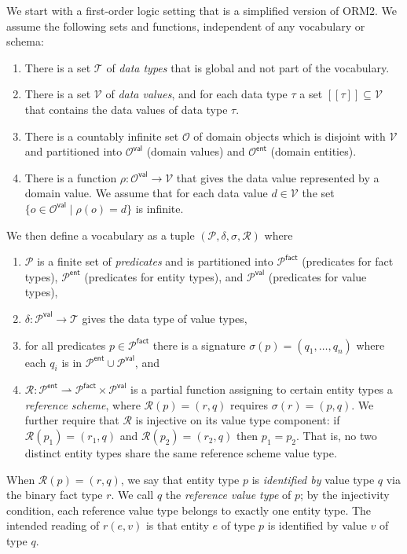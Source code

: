 \documentclass[11pt]{amsart}
\theoremstyle{definition}
\theoremstyle{remark}
\newcommand{\DataTypes}{\mathcal{T}}
\newcommand{\DataValues}{\mathcal{V}}
\newcommand{\DomObjects}{\mathcal{O}}
\newcommand{\DomValues}{\mathcal{O}^{\mathsf{val}}}
\newcommand{\DomEnts}{\mathcal{O}^{\mathsf{ent}}}
\newcommand{\Preds}{\mathcal{P}}
\newcommand{\EntPreds}{\Preds^{\textsf{ent}}}
\newcommand{\ValPreds}{\Preds^{\textsf{val}}}
\newcommand{\FactPreds}{\Preds^{\textsf{fact}}}
\newcommand{\RefSchemes}{\mathcal{R}}
\newcommand{\sem}[1]{[\![{#1}]\!]}
\begin{document}
We start with a first-order logic setting that is a simplified version of ORM2. We assume the following sets and functions, independent of any vocabulary or schema:
\begin{enumerate}
  \item There is a set $\DataTypes$ of \emph{data types} that is global and not part of the vocabulary.
  \item There is a set $\DataValues$ of \emph{data values}, and for each data type $\tau$ a set $\sem{\tau} \subseteq \DataValues$ that contains the data values of data type $\tau$.
  \item There is a countably infinite set $\DomObjects$ of domain objects which is disjoint with $\DataValues$ and partitioned into $\DomValues$ (domain values) and $\DomEnts$ (domain entities).
  \item There is a function $\rho : \DomValues \to \DataValues$ that gives the data value represented by a domain value. We assume that for each data value $d \in \DataValues$ the set $\{ o \in \DomValues \mid \rho(o) = d \}$ is infinite.
\end{enumerate}
We then define a vocabulary as a tuple $(\Preds, \delta, \sigma, \RefSchemes)$ where
    \begin{enumerate} 
      \item $\Preds$ is a finite set of \emph{predicates} and is partitioned into $\FactPreds$ (predicates for fact types), $\EntPreds$ (predicates for entity types), and $\ValPreds$ (predicates for value types),
      \item $\delta : \ValPreds \to \DataTypes$ gives the data type of value types,
      \item for all predicates $p \in \FactPreds$ there is a signature $\sigma(p) = (q_1, \ldots, q_n)$ where each $q_i$ is in $\EntPreds \cup \ValPreds$, and
      \item $\RefSchemes : \EntPreds \rightharpoonup \FactPreds \times \ValPreds$ is a partial function assigning to certain entity types a \emph{reference scheme}, where $\RefSchemes(p) = (r, q)$ requires $\sigma(r) = (p, q)$. We further require that $\RefSchemes$ is injective on its value type component: if $\RefSchemes(p_1) = (r_1, q)$ and $\RefSchemes(p_2) = (r_2, q)$ then $p_1 = p_2$. That is, no two distinct entity types share the same reference scheme value type.
    \end{enumerate}
When $\RefSchemes(p) = (r, q)$, we say that entity type $p$ is \emph{identified by} value type $q$ via the binary fact type $r$. We call $q$ the \emph{reference value type} of $p$; by the injectivity condition, each reference value type belongs to exactly one entity type. The intended reading of $r(e, v)$ is that entity $e$ of type $p$ is identified by value $v$ of type $q$.
\end{document}
